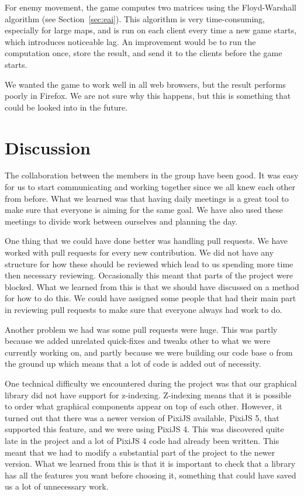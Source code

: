 \documentclass[a4paper]{article}
\begin{document}
For enemy movement, the game computes two matrices using the Floyd-Warshall algorithm (see Section~\ref{sec:eai}). This algorithm is very time-consuming, especially for large maps, and is run on each client every time a new game starts, which introduces noticeable lag. An improvement would be to run the computation once, store the result, and send it to the clients before the game starts.

We wanted the game to work well in all web browsers, but the result performs poorly in Firefox. We are not sure why this happens, but this is something that could be looked into in the future.

\section{Discussion}
The collaboration between the members in the group have been good. It was easy for us to start communicating and working together since we all knew each other from before. What we learned was that having daily meetings is a great tool to make sure that everyone is aiming for the same goal. We have also used these meetings to divide work between ourselves and planning the day.

One thing that we could have done better was handling pull requests. We have worked with pull requests for every new contribution. We did not have any structure for how these should be reviewed which lead to us spending more time then necessary reviewing. Occasionally this meant that parts of the project were blocked. What we learned from this is that we should have discussed on a method for how to do this. We could have assigned some people that had their main part in reviewing pull requests to make sure that everyone always had work to do.

Another problem we had was some pull requests were huge. This was partly because we added unrelated quick-fixes and tweaks other to what we were currently working on, and partly because we were building our code base o from the ground up which means that a lot of code is added out of necessity.

One technical difficulty we encountered during the project was that our graphical library did not have support for z-indexing. Z-indexing means that it is possible to order what graphical components appear on top of each other. However, it turned out that there was a newer version of PixiJS available, PixiJS 5, that supported this feature, and we were using PixiJS 4. This was discovered quite late in the project and a lot of PixiJS 4 code had already been written. This meant that we had to modify a substantial part of the project to the newer version. What we learned from this is that it is important to check that a library has all the features you want before choosing it, something that could have saved us a lot of unnecessary work.
\end{document}

